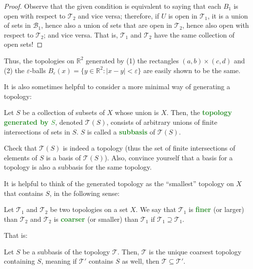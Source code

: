 \documentclass[11pt]{scrartcl}
\providecommand{\eps}{\varepsilon}
\providecommand{\RR}{\mathbb R}
\providecommand{\vocab}[1]{{\textbf{\textcolor{ForestGreen}{#1}}}}
\begin{document}
\begin{proof}
    Observe that the given condition is equivalent to saying that
    each $B_1$ is open with respect to $\mathcal T_2$ and vice versa;
    therefore, if $U$ is open in $\mathcal T_1$,
    it is a union of sets in $\mathcal B_1$, hence also a union of sets
    that are open in $\mathcal T_2$, hence also open with respect to $\mathcal T_2$;
    and vice versa. That is, $\mathcal T_1$ and $\mathcal T_2$
    have the same collection of open sets!
\end{proof}

Thus, the topologies on $\RR^2$ generated by (1) the rectangles $(a,b)\times(c,d)$
and (2) the $\eps$-balls $B_\eps(x) = \{y\in\RR^2 : |x-y|<\eps \}$
are easily shown to be the same.

It is also sometimes helpful to consider a more minimal way of generating a topology:
\begin{definition}[Subbasis]
    \label{def:subbasis}
    Let $S$ be a collection of subsets of $X$ whose union is $X$.
    Then, the \vocab{topology generated by $S$}, denoted $\mathcal T(S)$,
    consists of arbitrary unions of finite intersections of sets in $S$.
    $S$ is called a \vocab{subbasis} of $\mathcal T(S)$.
\end{definition}

\begin{exercise}
    Check that $\mathcal T(S)$ is indeed a topology
    (thus the set of finite intersections of elements of $S$
    is a basis of $\mathcal T(S)$).
    Also, convince yourself that a basis for a topology
    is also a subbasis for the same topology.
\end{exercise}

It is helpful to think of the generated topology as
the ``smallest'' topology on $X$ that contains $S$, in the following sense:
\begin{definition}
    \label{def:finecoarse}
    Let $\mathcal T_1$ and $\mathcal T_2$ be two topologies on a set $X$.
    We say that $\mathcal T_1$ is \vocab{finer} (or larger)
    than $\mathcal T_2$ and $\mathcal T_2$ is \vocab{coarser} (or smaller)
    than $\mathcal T_1$ if $\mathcal T_1\supseteq\mathcal T_1$.
\end{definition}
That is:
\begin{theorem}
    \label{thm:minimality-generatedtop}
    Let $S$ be a subbasis of the topology $\mathcal T$.
    Then, $\mathcal T$ is the unique coarsest topology containing $S$,
    meaning if $\mathcal T'$ contains $S$ as well,
    then $\mathcal T\subseteq\mathcal T'$.
\end{theorem}
\end{document}
